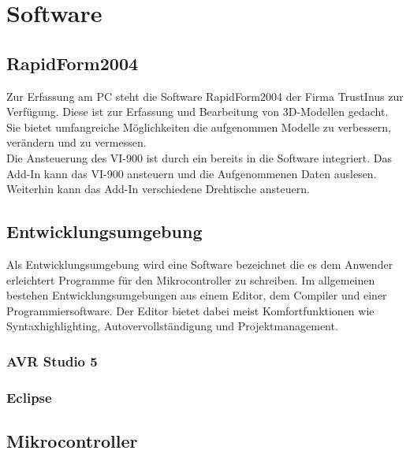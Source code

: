 \chapter{Software}
\label{cha:Software}

\section{RapidForm2004}
\label{sec:RapidForm}
Zur Erfassung am PC steht die Software RapidForm2004 der Firma TrustInus zur Verfügung. Diese ist zur Erfassung und Bearbeitung von 3D-Modellen gedacht. Sie bietet umfangreiche Möglichkeiten die aufgenommen Modelle zu verbessern, verändern und zu vermessen.\\
Die Ansteuerung des VI-900 ist durch ein  bereits in die Software integriert. Das Add-In kann das VI-900 ansteuern und die Aufgenommenen Daten auslesen. Weiterhin kann das Add-In verschiedene Drehtische ansteuern.

\section{Entwicklungsumgebung}
\label{sec:Entwicklungsumgebung}
Als Entwicklungsumgebung wird eine Software bezeichnet die es dem Anwender erleichtert Programme für den Mikrocontroller zu schreiben. Im allgemeinen bestehen Entwicklungsumgebungen aus einem Editor, dem Compiler und einer Programmiersoftware. Der Editor bietet dabei meist Komfortfunktionen wie Syntaxhighlighting, Autovervollständigung und Projektmanagement.  
\subsection{AVR Studio 5}
\subsection{Eclipse}

\section{Mikrocontroller}
